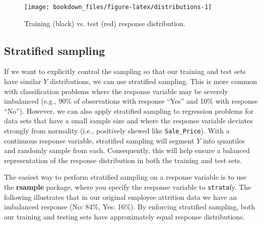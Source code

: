 \documentclass[]{krantz}
\begin{document}
\begin{figure}

{\centering \texttt{[image: bookdown\_files/figure-latex/distributions-1]} 

}

\caption{Training (black) vs. test (red) response distribution.}\label{fig:distributions}
\end{figure}

\hypertarget{stratified}{%
\subsection{Stratified sampling}\label{stratified}}

If we want to explicitly control the sampling so that our training and test sets have similar \(Y\) distributions, we can use stratified sampling. This is more common with classification problems where the response variable may be severely imbalanced (e.g., 90\% of observations with response ``Yes'' and 10\% with response ``No''). However, we can also apply stratified sampling to regression problems for data sets that have a small sample size and where the response variable deviates strongly from normality (i.e., positively skewed like \texttt{Sale\_Price}). With a continuous response variable, stratified sampling will segment \(Y\) into quantiles and randomly sample from each. Consequently, this will help ensure a balanced representation of the response distribution in both the training and test sets.

The easiest way to perform stratified sampling on a response variable is to use the \textbf{rsample} package, where you specify the response variable to \texttt{strata}fy. The following illustrates that in our original employee attrition data we have an imbalanced response (No: 84\%, Yes: 16\%). By enforcing stratified sampling, both our training and testing sets have approximately equal response distributions.
\end{document}
